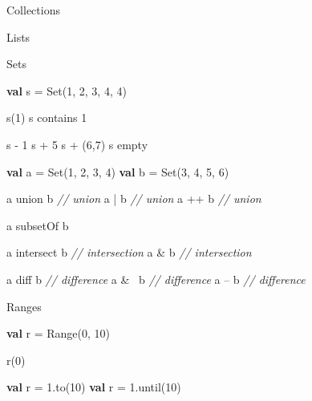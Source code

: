 \documentclass[ignorenonframetext,]{beamer}
\newenvironment{Shaded}{\begin{snugshade}}{\end{snugshade}}
\newcommand{\KeywordTok}[1]{\textcolor[rgb]{0.13,0.29,0.53}{\textbf{#1}}}
\newcommand{\DecValTok}[1]{\textcolor[rgb]{0.00,0.00,0.81}{#1}}
\newcommand{\FloatTok}[1]{\textcolor[rgb]{0.00,0.00,0.81}{#1}}
\newcommand{\CommentTok}[1]{\textcolor[rgb]{0.56,0.35,0.01}{\textit{#1}}}
\newcommand{\FunctionTok}[1]{\textcolor[rgb]{0.00,0.00,0.00}{#1}}
\newcommand{\NormalTok}[1]{#1}
\begin{document}
\begin{frame}[fragile]{Collections}
\begin{block}{Lists}
\end{block}

\begin{block}{Sets}

\begin{Shaded}
\begin{Highlighting}[]
\KeywordTok{val}\NormalTok{ s = Set(}\DecValTok{1}\NormalTok{, }\DecValTok{2}\NormalTok{, }\DecValTok{3}\NormalTok{, }\DecValTok{4}\NormalTok{, }\DecValTok{4}\NormalTok{)}

\FunctionTok{s}\NormalTok{(}\DecValTok{1}\NormalTok{)}
\NormalTok{s contains }\DecValTok{1}

\NormalTok{s - }\DecValTok{1}
\NormalTok{s + }\DecValTok{5}
\NormalTok{s + (}\DecValTok{6}\NormalTok{,}\DecValTok{7}\NormalTok{)}
\NormalTok{s empty}

\KeywordTok{val}\NormalTok{ a = Set(}\DecValTok{1}\NormalTok{, }\DecValTok{2}\NormalTok{, }\DecValTok{3}\NormalTok{, }\DecValTok{4}\NormalTok{)}
\KeywordTok{val}\NormalTok{ b = Set(}\DecValTok{3}\NormalTok{, }\DecValTok{4}\NormalTok{, }\DecValTok{5}\NormalTok{, }\DecValTok{6}\NormalTok{)}

\NormalTok{a union b       }\CommentTok{// union}
\NormalTok{a | b           }\CommentTok{// union}
\NormalTok{a ++ b          }\CommentTok{// union}

\NormalTok{a subsetOf b}

\NormalTok{a intersect b   }\CommentTok{// intersection}
\NormalTok{a & b           }\CommentTok{// intersection}

\NormalTok{a diff b        }\CommentTok{// difference}
\NormalTok{a &~ b          }\CommentTok{// difference}
\NormalTok{a -- b          }\CommentTok{// difference}
\end{Highlighting}
\end{Shaded}

\end{block}

\begin{block}{Ranges}

\begin{Shaded}
\begin{Highlighting}[]
\KeywordTok{val}\NormalTok{ r = }\FunctionTok{Range}\NormalTok{(}\DecValTok{0}\NormalTok{, }\DecValTok{10}\NormalTok{)}

\FunctionTok{r}\NormalTok{(}\DecValTok{0}\NormalTok{)}

\KeywordTok{val}\NormalTok{ r = }\FloatTok{1.}\FunctionTok{to}\NormalTok{(}\DecValTok{10}\NormalTok{)}
\KeywordTok{val}\NormalTok{ r = }\FloatTok{1.}\FunctionTok{until}\NormalTok{(}\DecValTok{10}\NormalTok{)}


\end{Highlighting}
\end{Shaded}
\end{block}
\end{frame}
\end{document}
